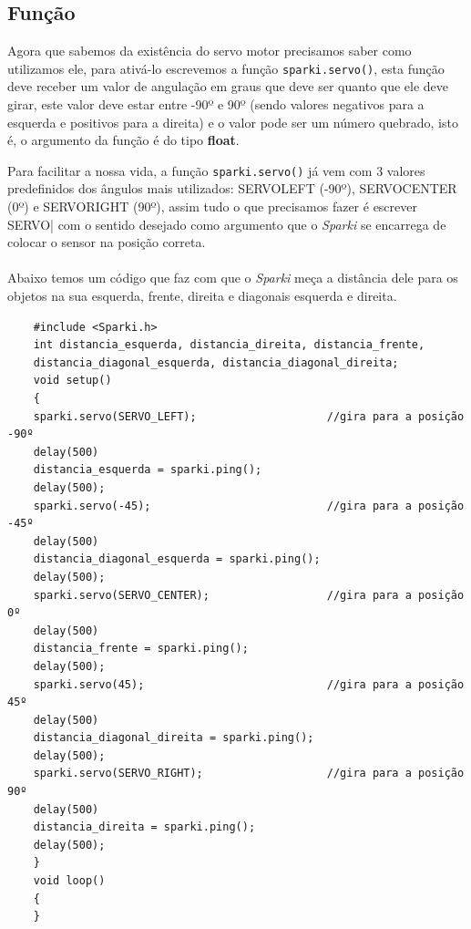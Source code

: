 \subsection{Função}

    Agora que sabemos da existência do servo motor precisamos saber como utilizamos ele, para ativá-lo escrevemos a função \texttt{sparki.servo()}, esta função deve receber um valor de angulação em graus que deve ser quanto que ele deve girar, este valor deve estar entre -90º e 90º (sendo valores negativos para a esquerda e positivos para a direita) e o valor pode ser um número quebrado, isto é, o argumento da função é do tipo \textbf{float}.
    
    Para facilitar a nossa vida, a função \texttt{sparki.servo()} já vem com 3 valores predefinidos dos ângulos mais utilizados: SERVO\underline{\hspace{.1in}}LEFT (-90º),  SERVO\underline{\hspace{.1in}}CENTER (0º) e SERVO\underline{\hspace{.1in}}RIGHT (90º), assim tudo o que precisamos fazer é escrever SERVO\underline{\hspace{.1in}}| com o sentido desejado como argumento que o \textit{Sparki} se encarrega de colocar o sensor na posição correta.
    \\~\\
    Abaixo temos um código que faz com que o \textit{Sparki} meça a distância dele para os objetos na sua esquerda, frente, direita e diagonais esquerda e direita.
    \begin{verbatim}
    #include <Sparki.h>
    int distancia_esquerda, distancia_direita, distancia_frente,
    distancia_diagonal_esquerda, distancia_diagonal_direita;
    void setup()
    {
    sparki.servo(SERVO_LEFT);                    //gira para a posição -90º
    delay(500)
    distancia_esquerda = sparki.ping();  
    delay(500);
    sparki.servo(-45);                           //gira para a posição -45º
    delay(500)
    distancia_diagonal_esquerda = sparki.ping();  
    delay(500);
    sparki.servo(SERVO_CENTER);                  //gira para a posição 0º
    delay(500)
    distancia_frente = sparki.ping();  
    delay(500);
    sparki.servo(45);                            //gira para a posição 45º
    delay(500)
    distancia_diagonal_direita = sparki.ping();  
    delay(500);
    sparki.servo(SERVO_RIGHT);                   //gira para a posição 90º
    delay(500)
    distancia_direita = sparki.ping();  
    delay(500);
    }
    void loop()
    {
    }
    \end{verbatim}    
    

